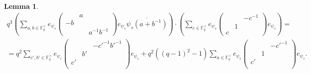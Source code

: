 \documentclass[12pt,reqno]{amsart}
\newtheorem{lem}[thm]{Lemma}
\theoremstyle{definition}
\theoremstyle{remark}
\numberwithin{equation}{section}
\begin{document}
\begin{lem}\label{B_5}
    \begin{align*}
        q^3\left(\sum_{a, b \in \mathbb{F}_q^\times}e_{\psi_s} \begin{pmatrix}
            & a &\\
            -b & &\\
            & & a^{-1}b^{-1}
        \end{pmatrix} e_{\psi_s} \overline{\psi_s(a+b^{-1})} \right)\cdot \left(\sum_{c \in \mathbb{F}_q^\times} e_{\psi_s} \begin{pmatrix}
            & & -c^{-1}\\
            & 1 &\\
            c & &
        \end{pmatrix}e_{\psi_s}\right) =\\= q^2 \sum_{c', b' \in \mathbb{F}_q^\times}e_{\psi_s} \begin{pmatrix}
            & & -c'^{-1}b'^{-1}\\
            & b' & \\
            c' & &\\
        \end{pmatrix} e_{\psi_s}+q^2((q-1)^2-1) \sum_{a \in \mathbb{F}_q^\times}e_{\psi_s} \begin{pmatrix}
            & & -c'^{-1}\\
            & 1 & \\
            c' & &\\
        \end{pmatrix} e_{\psi_s}.
    \end{align*}
\end{lem}
\end{document}
